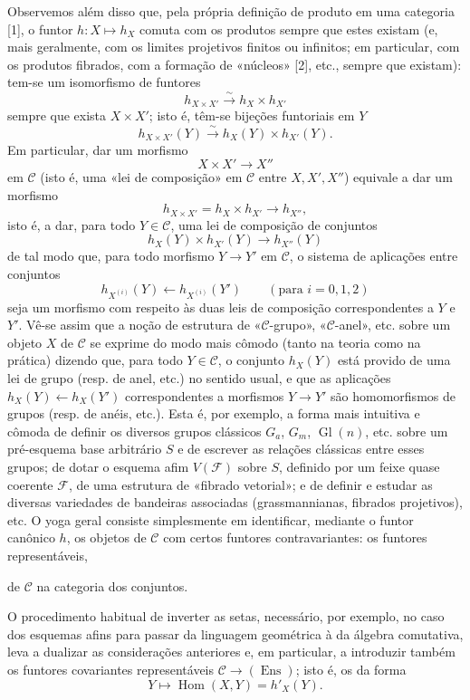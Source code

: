Observemos além disso que, pela própria definição de produto em uma categoria
[1], o funtor $h:X\longmapsto h_X$ comuta com os produtos sempre que estes
existam (e, mais geralmente, com os limites projetivos finitos ou infinitos;
em particular, com os produtos fibrados, com a formação de «núcleos» [2],
etc., sempre que existam): tem-se um isomorfismo de funtores
\[
  h_{X\times X'}\xrightarrow{\sim}h_X\times h_{X'}
\]
sempre que exista $X\times X'$; isto é, têm-se bijeções funtoriais
em $Y$
\[
  h_{X\times X'}(Y)\xrightarrow{\sim}h_X(Y)\times h_{X'}(Y).
\]
Em particular, dar um morfismo
\[
  X\times X'\longrightarrow X''
\]
em $\mathcal C$ (isto é, uma «lei de composição» em $\mathcal C$ entre
$X,X',X''$) equivale a dar um morfismo
\[
  h_{X\times X'}=h_X\times h_{X'}\longrightarrow h_{X''},
\]
isto é, a dar, para todo $Y\in\mathcal C$, uma lei de composição de
conjuntos
\[
  h_X(Y)\times h_{X'}(Y)\longrightarrow h_{X''}(Y)
\]
de tal modo que, para todo morfismo $Y\longrightarrow Y'$ em $\mathcal C$, o
sistema de aplicações entre conjuntos
\[
  h_{X^{(i)}}(Y)\longleftarrow h_{X^{(i)}}(Y')
  \qquad(\text{para }i=0,1,2)
\]
seja um morfismo com respeito às duas leis de composição correspondentes a
$Y$ e $Y'$. Vê-se assim que a noção de estrutura de «$\mathcal C$-grupo»,
«$\mathcal C$-anel», etc. sobre um objeto $X$ de $\mathcal C$ se exprime do
modo mais cômodo (tanto na teoria como na prática) dizendo que, para
todo $Y\in\mathcal C$, o conjunto $h_X(Y)$ está provido de uma lei de grupo
(resp. de anel, etc.) no sentido usual, e que as aplicações
$h_X(Y)\longleftarrow h_X(Y')$ correspondentes a morfismos
$Y\longrightarrow Y'$ são homomorfismos de grupos (resp. de anéis, etc.).
Esta é, por exemplo, a forma mais intuitiva e cômoda de definir os diversos
grupos clássicos $G_a$, $G_m$, $\operatorname{Gl}(n)$, etc. sobre um pré-esquema
base arbitrário $S$ e de escrever as relações clássicas entre esses grupos;
de dotar o esquema afim $V(\mathcal F)$ sobre $S$, definido por um feixe
quase coerente $\mathcal F$, de uma estrutura de «fibrado vetorial»; e de
definir e estudar as diversas variedades de bandeiras associadas
(grassmannianas, fibrados projetivos), etc. O yoga geral consiste
simplesmente em identificar, mediante o funtor canônico $h$, os objetos de
$\mathcal C$ com certos funtores contravariantes: os funtores representáveis,

de $\mathcal C$ na categoria dos conjuntos.

O procedimento habitual de inverter as setas, necessário, por exemplo, no
caso dos esquemas afins para passar da linguagem geométrica à da álgebra
comutativa, leva a dualizar as considerações anteriores e, em
particular, a introduzir também os funtores covariantes representáveis
$\mathcal C\longrightarrow(\operatorname{Ens})$; isto é, os da forma
\[
  Y\longmapsto\operatorname{Hom}(X,Y)=h'_X(Y).
\]


